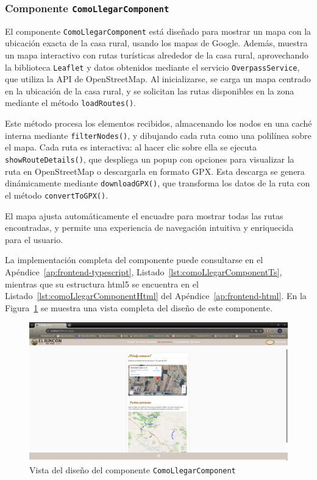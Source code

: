 \subsubsection{Componente \texttt{ComoLlegarComponent}}
El componente \texttt{ComoLlegarComponent} está diseñado para mostrar un mapa con la ubicación exacta de la casa rural, usando los mapas de Google. Además, muestra un mapa interactivo con rutas turísticas alrededor de la casa rural, aprovechando la biblioteca \texttt{Leaflet} y datos obtenidos mediante el servicio \texttt{OverpassService}, que utiliza la API de OpenStreetMap. Al inicializarse, se carga un mapa centrado en la ubicación de la casa rural, y se solicitan las rutas disponibles en la zona mediante el método \texttt{loadRoutes()}.

Este método procesa los elementos recibidos, almacenando los nodos en una caché interna mediante \texttt{filterNodes()}, y dibujando cada ruta como una polilínea sobre el mapa. Cada ruta es interactiva: al hacer clic sobre ella se ejecuta \texttt{showRouteDetails()}, que despliega un popup con opciones para visualizar la ruta en OpenStreetMap o descargarla en formato GPX. Esta descarga se genera dinámicamente mediante \texttt{downloadGPX()}, que transforma los datos de la ruta con el método \texttt{convertToGPX()}.

El mapa ajusta automáticamente el encuadre para mostrar todas las rutas encontradas, y permite una experiencia de navegación intuitiva y enriquecida para el usuario.


La implementación completa del componente puede consultarse en el Apéndice~\ref{ap:frontend-typescript}, Listado~\ref{lst:comoLlegarComponentTs}, mientras que su estructura \gls{html5} se encuentra en el Listado~\ref{lst:comoLlegarComponentHtml} del Apéndice~\ref{ap:frontend-html}.
En la Figura~\ref{fig:como-llegar-component} se muestra una vista completa del diseño de este componente.
\begin{figure}

    \centering
        \includegraphics[width=1\textwidth]{figs/como-llegar.png}
        \caption{Vista del diseño del componente \texttt{ComoLlegarComponent}}
        \label{fig:como-llegar-component}
\end{figure}

